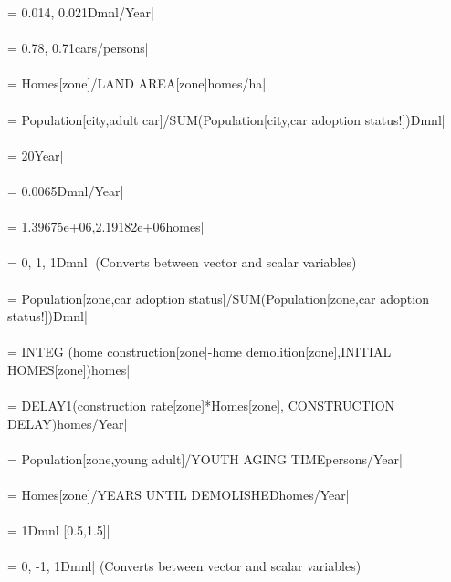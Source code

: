  = 0.014, 0.021Dmnl/Year| \\ \\ 
 = 0.78, 0.71cars/persons| \\ \\ 
 = Homes[zone]/LAND AREA[zone]homes/ha| \\ \\ 
 = Population[city,adult car]/SUM(Population[city,car adoption status!])Dmnl| \\ \\ 
 = 20Year| \\ \\ 
 = 0.0065Dmnl/Year| \\ \\ 
 = 1.39675e+06,2.19182e+06homes| \\ \\ 
 = 0, 1, 1Dmnl| (Converts between vector and scalar variables) \\ \\ 
 = Population[zone,car adoption status]/SUM(Population[zone,car adoption status!])Dmnl| \\ \\ 
 =  INTEG (home construction[zone]-home demolition[zone],INITIAL HOMES[zone])homes| \\ \\ 
 = DELAY1(construction rate[zone]*Homes[zone], CONSTRUCTION DELAY)homes/Year| \\ \\ 
 = Population[zone,young adult]/YOUTH AGING TIMEpersons/Year| \\ \\ 
 = Homes[zone]/YEARS UNTIL DEMOLISHEDhomes/Year| \\ \\ 
 = 1Dmnl [0.5,1.5]| \\ \\ 
 = 0, -1, 1Dmnl| (Converts between vector and scalar variables) \\ \\ 
